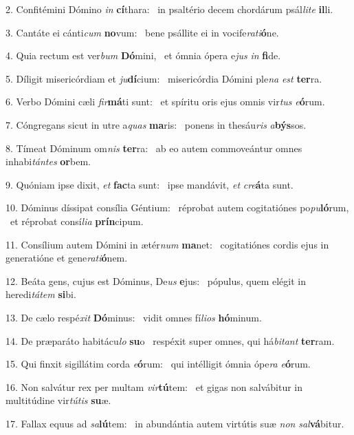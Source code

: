 2. Confitémini Dómino \textit{in} \textbf{cí}thara: \ast\  in psaltério decem chordárum psál\textit{li}\textit{te} \textbf{il}li.\

3. Cantáte ei cánti\textit{cum} \textbf{no}vum: \ast\  bene psállite ei in vocife\textit{ra}\textit{ti}\textbf{ó}ne.\

4. Quia rectum est ver\textit{bum} \textbf{Dó}mini, \ast\  et ómnia ópera e\textit{jus} \textit{in} \textbf{fi}de.\

5. Díligit misericórdiam et \textit{ju}\textbf{dí}cium: \ast\  misericórdia Dómini ple\textit{na} \textit{est} \textbf{ter}ra.\

6. Verbo Dómini cæli \textit{fir}\textbf{má}ti sunt: \ast\  et spíritu oris ejus omnis vir\textit{tus} \textit{e}\textbf{ó}rum.\

7. Cóngregans sicut in utre a\textit{quas} \textbf{ma}ris: \ast\  ponens in thesáu\textit{ris} \textit{a}\textbf{býs}sos.\

8. Tímeat Dóminum om\textit{nis} \textbf{ter}ra: \ast\  ab eo autem commoveántur omnes inhabi\textit{tán}\textit{tes} \textbf{or}bem.\

9. Quóniam ipse dixit, \textit{et} \textbf{fac}ta sunt: \ast\  ipse mandávit, \textit{et} \textit{cre}\textbf{á}ta sunt.\

10. Dóminus díssipat consília Géntium: \dag\  réprobat autem cogitatiónes po\textit{pu}\textbf{ló}rum, \ast\  et réprobat consí\textit{li}\textit{a} \textbf{prín}cipum.\

11. Consílium autem Dómini in ætér\textit{num} \textbf{ma}net: \ast\  cogitatiónes cordis ejus in generatióne et gene\textit{ra}\textit{ti}\textbf{ó}nem.\

12. Beáta gens, cujus est Dóminus, De\textit{us} \textbf{e}jus: \ast\  pópulus, quem elégit in heredi\textit{tá}\textit{tem} \textbf{si}bi.\

13. De cælo respé\textit{xit} \textbf{Dó}minus: \ast\  vidit omnes fí\textit{li}\textit{os} \textbf{hó}minum.\

14. De præparáto habitácu\textit{lo} \textbf{su}o \ast\  respéxit super omnes, qui há\textit{bi}\textit{tant} \textbf{ter}ram.\

15. Qui finxit sigillátim corda \textit{e}\textbf{ó}rum: \ast\  qui intélligit ómnia ópe\textit{ra} \textit{e}\textbf{ó}rum.\

16. Non salvátur rex per multam \textit{vir}\textbf{tú}tem: \ast\  et gigas non salvábitur in multitúdine vir\textit{tú}\textit{tis} \textbf{su}æ.\

17. Fallax equus ad \textit{sa}\textbf{lú}tem: \ast\  in abundántia autem virtútis suæ \textit{non} \textit{sal}\textbf{vá}bitur.\

